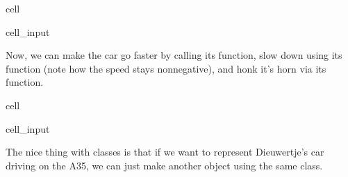 \documentclass[letterpaper,10pt,english]{jupyterBook}
\begin{document}
\begin{sphinxuseclass}{cell}\begin{sphinxVerbatimInput}

\begin{sphinxuseclass}{cell_input}
\begin{sphinxVerbatim}[commandchars=\\\{\}]
   
\end{sphinxVerbatim}

\end{sphinxuseclass}\end{sphinxVerbatimInput}

\end{sphinxuseclass}
\sphinxAtStartPar
Now, we can make the car go faster by calling its  function, slow down using its  function (note how the speed stays non\sphinxhyphen{}negative), and honk it’s horn via its  function.

\begin{sphinxuseclass}{cell}\begin{sphinxVerbatimInput}

\begin{sphinxuseclass}{cell_input}
\begin{sphinxVerbatim}[commandchars=\\\{\}]

\end{sphinxVerbatim}

\end{sphinxuseclass}\end{sphinxVerbatimInput}

\end{sphinxuseclass}
\sphinxAtStartPar
The nice thing with classes is that if we want to represent Dieuwertje’s car driving on the A35, we can just make another object using the same class.
\end{document}
